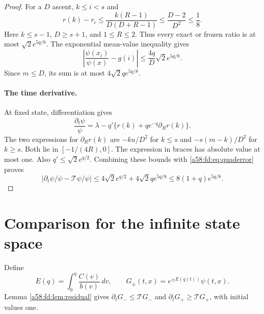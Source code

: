 \documentclass[11pt,letterpaper]{article}
\theoremstyle{remark}
\newcommand{\TT}{\mathcal T}
\begin{document}
\begin{proof}
For a $D$ ascent, $k\le i<s$ and
\[
 r(k)-r_i\le\frac{k(R-1)}{D(D+R-1)}
 \le\frac{D-2}{D^2}\le\frac18.
\]
Here $k\le s-1$, $D\ge s+1$, and $1\le R\le2$. Thus every exact or frozen ratio is at most $\sqrt2e^{5q/8}$. The exponential mean-value inequality gives
\[
 \left|\frac{\psi(x_i)}{\psi(x)}-g(i)\right|
 \le\frac{4q}{D}\sqrt2e^{5q/8}.
\]
Since $m\le D$, its sum is at most $4\sqrt2q e^{5q/8}$.

\paragraph{The time derivative.}
At fixed state, differentiation gives
\[
 \frac{\partial_t\psi}{\psi}
 =\lambda-q'\{r(k)+qe^{-q}\partial_Rr(k)\}.
\]
The two expressions for $\partial_Rr(k)$ are $-ku/D^2$ for $k\le s$ and $-s(m-k)/D^2$ for $k\ge s$. Both lie in $[-1/(4R),0]$. The expression in braces has absolute value at most one. Also $q'\le\sqrt2e^{q/2}$. Combining these bounds with \eqref{a58:fd:eq:quaderror} proves
\[
 |\partial_t\psi/\psi-\TT\psi/\psi|
 \le4\sqrt2e^{q/2}+4\sqrt2q e^{5q/8}
 \le8(1+q)e^{5q/8}.
\]
\end{proof}

\section{Comparison for the infinite state space}
Define
\begin{equation}\label{a58:fd:eq:E}
 E(q)=\int_0^q\frac{C(v)}{b(v)}\,dv,\qquad
 G_\pm(t,x)=e^{\pm E(q(t))}\psi(t,x).
\end{equation}
Lemma \ref{a58:fd:lem:residual} gives $\partial_tG_-\le\TT G_-$ and $\partial_tG_+\ge\TT G_+$, with initial values one.
\end{document}
